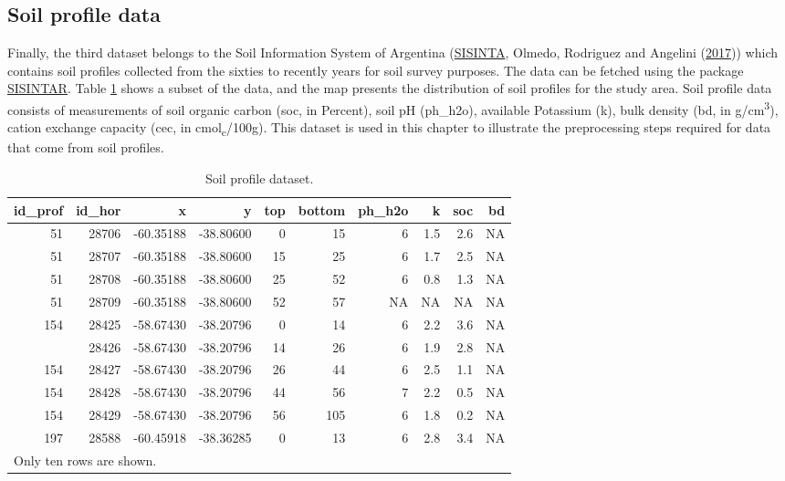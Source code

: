 \documentclass[
  10pt,
  b5paper,
  oneside]{book}
\begin{document}
\hypertarget{soil-profile-data}{%
\subsection{Soil profile data}\label{soil-profile-data}}

Finally, the third dataset belongs to the Soil Information System of Argentina (\href{http://sisinta.inta.gob.ar/}{SISINTA}, Olmedo, Rodriguez and Angelini (\protect\hyperlink{ref-Olmedo2017}{2017})) which contains soil profiles collected from the sixties to recently years for soil survey purposes. The data can be fetched using the package \href{https://github.com/INTA-Suelos/SISINTAR\#readme}{SISINTAR}. Table \ref{tab:table4} shows a subset of the data, and the map presents the distribution of soil profiles for the study area. Soil profile data consists of measurements of soil organic carbon (soc, in Percent), soil pH (ph\_h2o), available Potassium (k), bulk density (bd, in g/cm\textsuperscript{3}), cation exchange capacity (cec, in cmol\textsubscript{c}/100g). This dataset is used in this chapter to illustrate the preprocessing steps required for data that come from soil profiles.

\begin{table}

\caption{\label{tab:table4}Soil profile dataset.}
\centering
\begin{tabular}[t]{rrrrrrrrrr}
\toprule
id\_prof & id\_hor & x & y & top & bottom & ph\_h2o & k & soc & bd\\
\midrule
51 & 28706 & -60.35188 & -38.80600 & 0 & 15 & 6 & 1.5 & 2.6 & NA\\
51 & 28707 & -60.35188 & -38.80600 & 15 & 25 & 6 & 1.7 & 2.5 & NA\\
51 & 28708 & -60.35188 & -38.80600 & 25 & 52 & 6 & 0.8 & 1.3 & NA\\
51 & 28709 & -60.35188 & -38.80600 & 52 & 57 & NA & NA & NA & NA\\
154 & 28425 & -58.67430 & -38.20796 & 0 & 14 & 6 & 2.2 & 3.6 & NA\\
\addlinespace
154 & 28426 & -58.67430 & -38.20796 & 14 & 26 & 6 & 1.9 & 2.8 & NA\\
154 & 28427 & -58.67430 & -38.20796 & 26 & 44 & 6 & 2.5 & 1.1 & NA\\
154 & 28428 & -58.67430 & -38.20796 & 44 & 56 & 7 & 2.2 & 0.5 & NA\\
154 & 28429 & -58.67430 & -38.20796 & 56 & 105 & 6 & 1.8 & 0.2 & NA\\
197 & 28588 & -60.45918 & -38.36285 & 0 & 13 & 6 & 2.8 & 3.4 & NA\\
\bottomrule
\multicolumn{10}{l}{\rule{0pt}{1em}Only ten rows are shown.}\\
\end{tabular}
\end{table}
\end{document}
